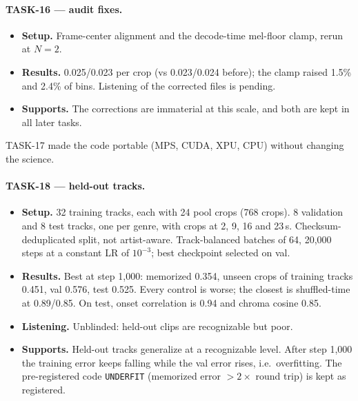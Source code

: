 \documentclass[10pt,letterpaper]{article}
\begin{document}
\paragraph{TASK-16 --- audit fixes.}
\begin{itemize}
\item \textbf{Setup.} Frame-center alignment and the decode-time mel-floor clamp, rerun at $N{=}2$.
\item \textbf{Results.} 0.025/0.023 per crop (vs 0.023/0.024 before); the clamp raised 1.5\% and 2.4\% of bins. Listening of the corrected files is pending.
\item \textbf{Supports.} The corrections are immaterial at this scale, and both are kept in all later tasks.
\end{itemize}
\noindent TASK-17 made the code portable (MPS, CUDA, XPU, CPU) without changing the science.

\paragraph{TASK-18 --- held-out tracks.}
\begin{itemize}
\item \textbf{Setup.} 32 training tracks, each with 24 pool crops (768 crops). 8 validation and 8 test tracks, one per genre, with crops at 2, 9, 16 and 23\,s. Checksum-deduplicated split, not artist-aware. Track-balanced batches of 64, 20{,}000 steps at a constant LR of $10^{-3}$; best checkpoint selected on val.
\item \textbf{Results.} Best at step 1{,}000: memorized 0.354, unseen crops of training tracks 0.451, val 0.576, test 0.525. Every control is worse; the closest is shuffled-time at 0.89/0.85. On test, onset correlation is 0.94 and chroma cosine 0.85.
\item \textbf{Listening.} Unblinded: held-out clips are recognizable but poor.
\item \textbf{Supports.} Held-out tracks generalize at a recognizable level. After step 1{,}000 the training error keeps falling while the val error rises, i.e.\ overfitting. The pre-registered code \texttt{UNDERFIT} (memorized error $>2\times$ round trip) is kept as registered.
\end{itemize}
\end{document}
